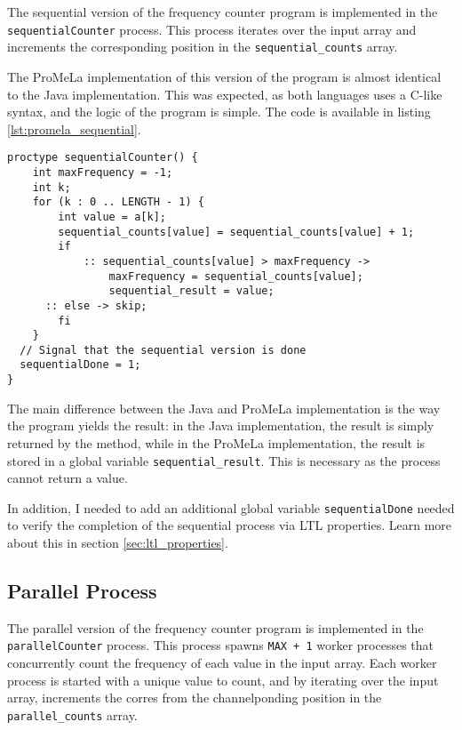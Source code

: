 \documentclass[a4paper, 11pt]{article}
\begin{document}
The sequential version of the frequency counter program is implemented in the \texttt{sequentialCounter} process. This process iterates over the input array and increments the corresponding position in the \texttt{sequential\_counts} array.

The ProMeLa implementation of this version of the program is almost identical to the Java implementation. This was expected, as both languages uses a C-like syntax, and the logic of the program is simple. The code is available in listing \ref{lst:promela_sequential}.

\begin{lstlisting}[language=Promela, caption={ProMeLa sequential version of the frequency counter program}, captionpos=b, breaklines=true, label={lst:promela_sequential}]
proctype sequentialCounter() {
	int maxFrequency = -1;
	int k;
	for (k : 0 .. LENGTH - 1) {
		int value = a[k];
		sequential_counts[value] = sequential_counts[value] + 1;
		if
			:: sequential_counts[value] > maxFrequency -> 
				maxFrequency = sequential_counts[value];
				sequential_result = value;
      :: else -> skip;
		fi
	}
  // Signal that the sequential version is done
  sequentialDone = 1;
}
\end{lstlisting}

The main difference between the Java and ProMeLa implementation is the way the program yields the result: in the Java implementation, the result is simply returned by the method, while in the ProMeLa implementation, the result is stored in a global variable \texttt{sequential\_result}. This is necessary as the process cannot return a value.

In addition, I needed to add an additional global variable \texttt{sequentialDone} needed to verify the completion of the sequential process via LTL properties. Learn more about this in section \ref{sec:ltl_properties}.

\subsection{Parallel Process}

The parallel version of the frequency counter program is implemented in the \texttt{parallelCounter} process. This process spawns \texttt{MAX + 1} worker processes that concurrently count the frequency of each value in the input array. Each worker process is started with a unique value to count, and by iterating over the input array, increments the corres from the channelponding position in the \texttt{parallel\_counts} array.
\end{document}
